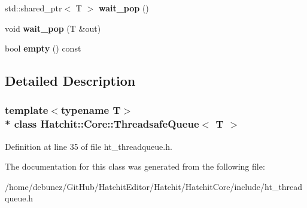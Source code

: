\begin{DoxyCompactItemize}
\item 
std\+::shared\+\_\+ptr$<$ T $>$ {\bfseries wait\+\_\+pop} ()\hypertarget{classHatchit_1_1Core_1_1ThreadsafeQueue_a50081612b96914987affc028933e7063}{}\label{classHatchit_1_1Core_1_1ThreadsafeQueue_a50081612b96914987affc028933e7063}

\item 
void {\bfseries wait\+\_\+pop} (T \&out)\hypertarget{classHatchit_1_1Core_1_1ThreadsafeQueue_aa85536716c46b367e849b0129a75c9a8}{}\label{classHatchit_1_1Core_1_1ThreadsafeQueue_aa85536716c46b367e849b0129a75c9a8}

\item 
bool {\bfseries empty} () const \hypertarget{classHatchit_1_1Core_1_1ThreadsafeQueue_a16a953cf3da09bb6165c916aa3adca7d}{}\label{classHatchit_1_1Core_1_1ThreadsafeQueue_a16a953cf3da09bb6165c916aa3adca7d}

\end{DoxyCompactItemize}


\subsection{Detailed Description}
\subsubsection*{template$<$typename T$>$\\*
class Hatchit\+::\+Core\+::\+Threadsafe\+Queue$<$ T $>$}



Definition at line 35 of file ht\+\_\+threadqueue.\+h.



The documentation for this class was generated from the following file\+:\begin{DoxyCompactItemize}
\item 
/home/debunez/\+Git\+Hub/\+Hatchit\+Editor/\+Hatchit/\+Hatchit\+Core/include/ht\+\_\+threadqueue.\+h\end{DoxyCompactItemize}

